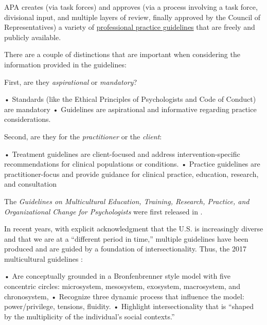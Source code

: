 \documentclass[
  english,
]{book}
\begin{document}
APA creates (via task forces) and approves (via a process involving a task force, divisional input, and multiple layers of review, finally approved by the Council of Representatives) a variety of \href{https://www.apa.org/practice/guidelines}{professional practice guidelines} that are freely and publicly available.

There are a couple of distinctions that are important when considering the information provided in the guidelines:

First, are they \emph{aspirational} or \emph{mandatory}?

• Standards (like the Ethical Principles of Psychologists and Code of Conduct) are mandatory
• Guidelines are aspirational and informative regarding practice considerations.

Second, are they for the \emph{practitioner} or the \emph{client}:

• Treatment guidelines are client-focused and address intervention-specific recommendations for clinical populations or conditions.
• Practice guidelines are practitioner-focus and provide guidance for clinical practice, education, research, and consultation

The \emph{Guidelines on Multicultural Education, Training, Research, Practice, and Organizational Change for Psychologists} were first released in \citep{american_psychological_association_guidelines_2002}.

In recent years, with explicit acknowledgment that the U.S. is increasingly diverse and that we are at a ``different period in time,'' multiple guidelines have been produced and are guided by a foundation of intersectionality. Thus, the 2017 multicultural guidelines \citep{task_force_on_re-envisioning_the_multicultural_guidelines_for_the_21st_century_multicultural_2017}:

• Are conceptually grounded in a Bronfenbrenner style model with five concentric circles: microsystem, mesosystem, exosystem, macrosystem, and chronosystem,
• Recognize three dynamic process that influence the model: power/privilege, tensions, fluidity.
• Highlight intersectionality that is ``shaped by the multiplicity of the individual's social contexts.''
\end{document}
